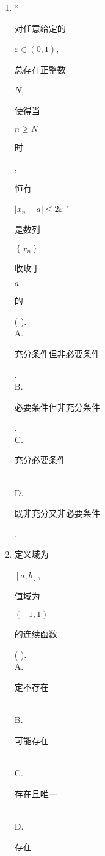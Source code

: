 \documentclass[10pt]{article}
\begin{document}
\begin{enumerate}
  \item “\begin{CJK}{UTF8}{mj}对任意给定的\end{CJK} $\varepsilon \in(0,1)$, \begin{CJK}{UTF8}{mj}总存在正整数\end{CJK} $N$, \begin{CJK}{UTF8}{mj}使得当\end{CJK} $n \geqslant N$ \begin{CJK}{UTF8}{mj}时\end{CJK}, \begin{CJK}{UTF8}{mj}恒有\end{CJK} $\left|x_{n}-a\right| \leqslant 2 \varepsilon$ " \begin{CJK}{UTF8}{mj}是数列\end{CJK} $\left\{x_{n}\right\}$ \begin{CJK}{UTF8}{mj}收玫于\end{CJK} $a$ \begin{CJK}{UTF8}{mj}的\end{CJK} ( ).\\
A. \begin{CJK}{UTF8}{mj}充分条件但非必要条件\end{CJK}.\\
B. \begin{CJK}{UTF8}{mj}必要条件但非充分条件\end{CJK}.\\
C. \begin{CJK}{UTF8}{mj}充分必要条件\end{CJK}\\
D. \begin{CJK}{UTF8}{mj}既非充分又非必要条件\end{CJK}.

  \item \begin{CJK}{UTF8}{mj}定义域为\end{CJK} $[a, b]$, \begin{CJK}{UTF8}{mj}值域为\end{CJK} $(-1,1)$ \begin{CJK}{UTF8}{mj}的连续函数\end{CJK} ( ).\\
A. \begin{CJK}{UTF8}{mj}定不存在\end{CJK}\\
B. \begin{CJK}{UTF8}{mj}可能存在\end{CJK}\\
C. \begin{CJK}{UTF8}{mj}存在且唯一\end{CJK}\\
D. \begin{CJK}{UTF8}{mj}存在\end{CJK}


\end{enumerate}
\end{document}
